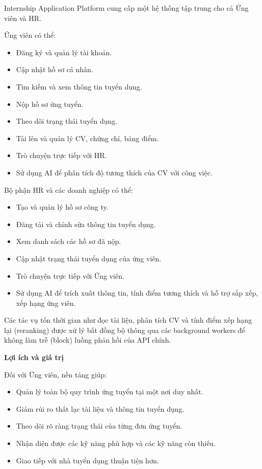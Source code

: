 Internship Application Platform cung cấp một hệ thống tập trung cho cả
Ứng viên và HR.

Ứng viên có thể:

\begin{itemize}
\tightlist
\item
  Đăng ký và quản lý tài khoản.
\item
  Cập nhật hồ sơ cá nhân.
\item
  Tìm kiếm và xem thông tin tuyển dụng.
\item
  Nộp hồ sơ ứng tuyển.
\item
  Theo dõi trạng thái tuyển dụng.
\item
  Tải lên và quản lý CV, chứng chỉ, bảng điểm.
\item
  Trò chuyện trực tiếp với HR.
\item
  Sử dụng AI để phân tích độ tương thích của CV với công việc.
\end{itemize}

Bộ phận HR và các doanh nghiệp có thể:

\begin{itemize}
\tightlist
\item
  Tạo và quản lý hồ sơ công ty.
\item
  Đăng tải và chỉnh sửa thông tin tuyển dụng.
\item
  Xem danh sách các hồ sơ đã nộp.
\item
  Cập nhật trạng thái tuyển dụng của ứng viên.
\item
  Trò chuyện trực tiếp với Ứng viên.
\item
  Sử dụng AI để trích xuất thông tin, tính điểm tương thích và hỗ trợ
  sắp xếp, xếp hạng ứng viên.
\end{itemize}

Các tác vụ tốn thời gian như đọc tài liệu, phân tích CV và tính điểm xếp
hạng lại (reranking) được xử lý bất đồng bộ thông qua các background
workers để không làm trễ (block) luồng phản hồi của API chính.

\vspace{0.5em}\noindent\textbf{Lợi ích và giá
trị}\par

Đối với Ứng viên, nền tảng giúp:

\begin{itemize}
\tightlist
\item
  Quản lý toàn bộ quy trình ứng tuyển tại một nơi duy nhất.
\item
  Giảm rủi ro thất lạc tài liệu và thông tin tuyển dụng.
\item
  Theo dõi rõ ràng trạng thái của từng đơn ứng tuyển.
\item
  Nhận diện được các kỹ năng phù hợp và các kỹ năng còn thiếu.
\item
  Giao tiếp với nhà tuyển dụng thuận tiện hơn.
\end{itemize}

